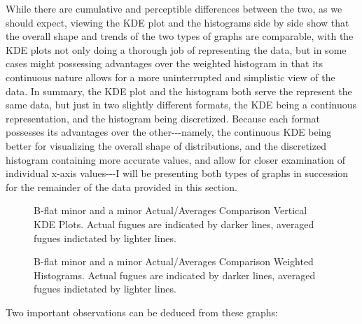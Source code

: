 While there are cumulative and perceptible differences between the two,
as we should expect, viewing the KDE plot and the histograms side by
side show that the overall shape and trends of the two types of graphs
are comparable, with the KDE plots not only doing a thorough job of
representing the data, but in some cases might possessing advantages
over the weighted histogram in that its continuous nature allows for a
more uninterrupted and simplistic view of the data. In summary, the KDE
plot and the histogram both serve the represent the same data, but just
in two slightly different formats, the KDE being a continuous
representation, and the histogram being discretized. Because each format
possesses its advantages over the other-\/-\/-namely, the continuous KDE
being better for visualizing the overall shape of distributions, and the
discretized histogram containing more accurate values, and allow for
closer examination of individual x-axis values-\/-\/-I will be
presenting both types of graphs in succession for the remainder of the
data provided in this section.




\begin{figure}[H]
    \begin{center}
    \caption[B-flat minor and a minor Actual/Averages Comparison Vertical KDE Plots. ]{B-flat minor and a minor Actual/Averages Comparison Vertical KDE Plots. Actual fugues are indicated by darker lines, averaged fugues indictated by lighter lines.}
    \end{center}
\end{figure}
    



\begin{figure}[H]
    \begin{center}
    \caption[B-flat minor and a minor Actual/Averages Comparison Weighted Histograms. ]{B-flat minor and a minor Actual/Averages Comparison Weighted Histograms. Actual fugues are indicated by darker lines, averaged fugues indictated by lighter lines.}
    \end{center}
\end{figure}
    
    Two important observations can be deduced from these graphs:

